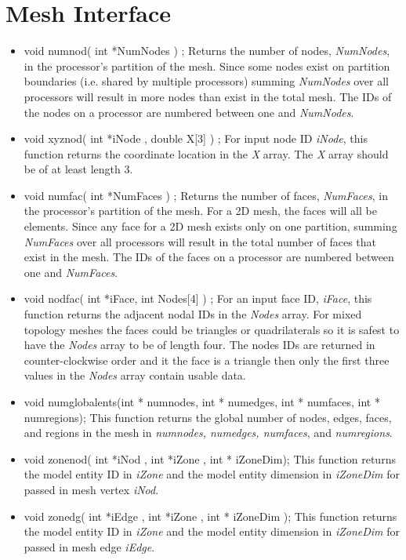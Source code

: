 \section{Mesh Interface}
\begin{itemize}
\item void numnod( int *NumNodes ) ; Returns the number of nodes, \textit{NumNodes}, in the processor's partition of the mesh.  Since
 some nodes  exist on partition boundaries (i.e. shared by multiple processors) summing \textit{NumNodes} over all
processors will result in more nodes than exist in the total mesh. The IDs of the nodes on a processor are numbered between
one and \textit{NumNodes}.
\item void xyznod( int *iNode , double X[3] ) ; For input node ID \textit{iNode}, this function returns the coordinate location in 
the \textit{X} array.  The \textit{X} array should be of at least length 3.
\item void numfac( int *NumFaces ) ; Returns the number of faces, \textit{NumFaces}, in the processor's partition of the mesh. 
For a 2D mesh, the faces will all be elements. Since
 any face for a 2D mesh  exists only on  one partition,  summing \textit{NumFaces} over all
processors will result in the total number of faces that exist in the mesh. The IDs of the faces on a processor are numbered between
one and \textit{NumFaces}.
\item void nodfac( int *iFace, int Nodes[4] ) ; For an input face ID, \textit{iFace}, this function returns the adjacent nodal IDs
in the \textit{Nodes} array.  
For mixed topology meshes the faces could be triangles or quadrilaterals so it is safest to have the \textit{Nodes} array to be of
length four.  The nodes IDs are returned in counter-clockwise order and it the face is a triangle then only the first three
values in the \textit{Nodes} array contain usable data.
\item void numglobalents(int * numnodes, int * numedges, int * numfaces, int * numregions); This function returns
the global number of nodes, edges, faces, and regions in the mesh in \textit{numnodes, numedges, numfaces}, and \textit{numregions}.
\item  void zonenod( int *iNod , int *iZone , int * iZoneDim); This function returns the model entity ID in 
\textit{iZone} and the model entity dimension in \textit{iZoneDim} for passed in mesh vertex \textit{iNod}.
\item void zonedg( int *iEdge , int *iZone , int * iZoneDim ); This function returns the model entity ID in 
\textit{iZone} and the model entity dimension in \textit{iZoneDim} for passed in mesh edge \textit{iEdge}.


\end{itemize}

